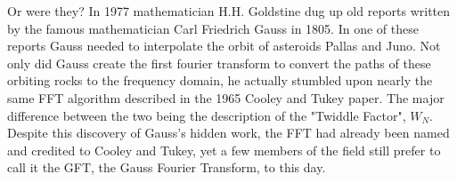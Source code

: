 \documentclass[sigplan]{acmart}
\begin{document}
Or were they? In 1977 mathematician H.H. Goldstine dug up  old reports written by the famous mathematician Carl Friedrich Gauss in 1805. In one of these reports Gauss needed to interpolate the orbit of asteroids Pallas and Juno. Not only did Gauss create the first fourier transform to convert the paths of these orbiting rocks to the frequency domain, he actually stumbled upon nearly the same FFT algorithm described in the 1965 Cooley and Tukey paper. The major difference between the two being the description of the "Twiddle Factor", $W_N$. Despite this discovery of Gauss's hidden work, the FFT had already been named and credited to Cooley and Tukey, yet  a few members of the field still prefer to call it the GFT, the Gauss Fourier Transform, to this day.
\end{document}
